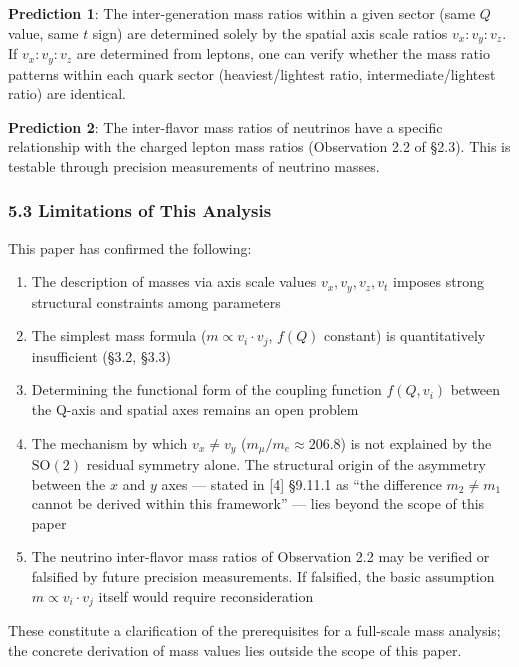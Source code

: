 \documentclass[
  a4paper,11pt]{article}
\providecommand{\tightlist}{%
  \setlength{\itemsep}{0pt}\setlength{\parskip}{0pt}}
\theoremstyle{definition}
\theoremstyle{remark}
\begin{document}
\textbf{Prediction 1}: The inter-generation mass ratios within a given
sector (same \(Q\) value, same \(t\) sign) are determined solely by the
spatial axis scale ratios \(v_x : v_y : v_z\). If \(v_x : v_y : v_z\)
are determined from leptons, one can verify whether the mass ratio
patterns within each quark sector (heaviest/lightest ratio,
intermediate/lightest ratio) are identical.

\textbf{Prediction 2}: The inter-flavor mass ratios of neutrinos have a
specific relationship with the charged lepton mass ratios (Observation
2.2 of §2.3). This is testable through precision measurements of
neutrino masses.

\subsubsection{5.3 Limitations of This
Analysis}\label{limitations-of-this-analysis}

This paper has confirmed the following:

\begin{enumerate}
\def\labelenumi{\arabic{enumi}.}
\tightlist
\item
  The description of masses via axis scale values \(v_x, v_y, v_z, v_t\)
  imposes strong structural constraints among parameters
\item
  The simplest mass formula (\(m \propto v_i \cdot v_j\), \(f(Q)\)
  constant) is quantitatively insufficient (§3.2, §3.3)
\item
  Determining the functional form of the coupling function \(f(Q, v_i)\)
  between the Q-axis and spatial axes remains an open problem
\item
  The mechanism by which \(v_x \neq v_y\)
  (\(m_\mu / m_e \approx 206.8\)) is not explained by the
  \(\mathrm{SO}(2)\) residual symmetry alone. The structural origin of
  the asymmetry between the \(x\) and \(y\) axes --- stated in {[}4{]}
  §9.11.1 as ``the difference \(m_2 \neq m_1\) cannot be derived within
  this framework'' --- lies beyond the scope of this paper
\item
  The neutrino inter-flavor mass ratios of Observation 2.2 may be
  verified or falsified by future precision measurements. If falsified,
  the basic assumption \(m \propto v_i \cdot v_j\) itself would require
  reconsideration
\end{enumerate}

These constitute a clarification of the prerequisites for a full-scale
mass analysis; the concrete derivation of mass values lies outside the
scope of this paper.
\end{document}
